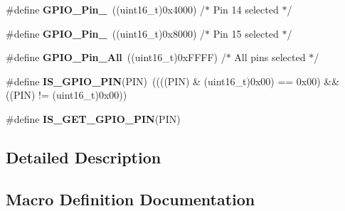 \begin{DoxyCompactItemize}
\item 
\#define {\bfseries G\+P\+I\+O\+\_\+\+Pin\+\_}~((uint16\+\_\+t)0x4000)  /$\ast$ Pin 14 selected $\ast$/\hypertarget{group___g_p_i_o__pins__define_ga21cd1d89c0c061a6f09c5a842610bee5}{}\label{group___g_p_i_o__pins__define_ga21cd1d89c0c061a6f09c5a842610bee5}

\item 
\#define {\bfseries G\+P\+I\+O\+\_\+\+Pin\+\_}~((uint16\+\_\+t)0x8000)  /$\ast$ Pin 15 selected $\ast$/\hypertarget{group___g_p_i_o__pins__define_gae686a9fc47cf3e420e5db0784210711d}{}\label{group___g_p_i_o__pins__define_gae686a9fc47cf3e420e5db0784210711d}

\item 
\#define {\bfseries G\+P\+I\+O\+\_\+\+Pin\+\_\+\+All}~((uint16\+\_\+t)0x\+F\+F\+F\+F)  /$\ast$ All pins selected $\ast$/\hypertarget{group___g_p_i_o__pins__define_gaba3e915ddca17a1211edc07b7fd97e8b}{}\label{group___g_p_i_o__pins__define_gaba3e915ddca17a1211edc07b7fd97e8b}

\item 
\#define {\bfseries I\+S\+\_\+\+G\+P\+I\+O\+\_\+\+P\+IN}(P\+IN)~((((P\+IN) \& (uint16\+\_\+t)0x00) == 0x00) \&\& ((\+P\+I\+N) != (uint16\+\_\+t)0x00))\hypertarget{group___g_p_i_o__pins__define_gad6ec74e33360395535ad5d91ba6d4781}{}\label{group___g_p_i_o__pins__define_gad6ec74e33360395535ad5d91ba6d4781}

\item 
\#define {\bfseries I\+S\+\_\+\+G\+E\+T\+\_\+\+G\+P\+I\+O\+\_\+\+P\+IN}(P\+IN)
\end{DoxyCompactItemize}


\subsection{Detailed Description}


\subsection{Macro Definition Documentation}
